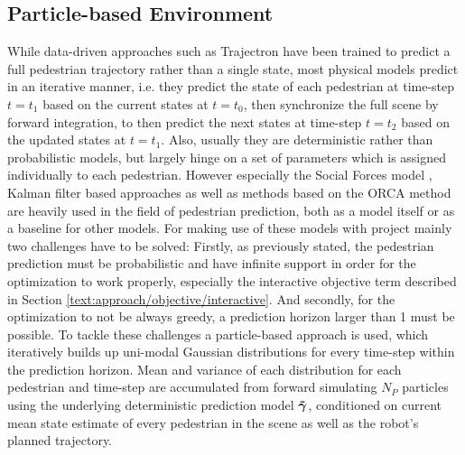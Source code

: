 \subsection{Particle-based Environment} 
While data-driven approaches such as Trajectron \cite{Ivanovic2018} have been trained to predict a full pedestrian trajectory rather than a single state, most physical models predict in an iterative manner, i.e. they predict the state of each pedestrian at time-step $t = t_1$ based on the current states at $t = t_0$, then synchronize the full scene by forward integration, to then predict the next states at time-step $t = t_2$ based on the updated states at $t = t_1$. Also, usually they are deterministic rather than probabilistic models, but largely hinge on a set of parameters which is assigned individually to each pedestrian. However especially the Social Forces model \cite{Helbing1995}, Kalman filter based approaches \cite{Schneider2013}\cite{Rehder2015}\cite{Guo2016} as well as methods based on the \ac{ORCA} method \cite{vandenBerg2011}\cite{Luo2018a}\cite{Charlton2019} are heavily used in the field of pedestrian prediction, both as a model itself or as a baseline for other models. For making use of these models with project \project mainly two challenges have to be solved: Firstly, as previously stated, the pedestrian prediction must be probabilistic and have infinite support in order for the optimization to work properly, especially the interactive objective term described in Section \ref{text:approach/objective/interactive}. And secondly, for the optimization to not be always greedy, a prediction horizon larger than 1 must be possible. 
\newline
To tackle these challenges a particle-based approach is used, which iteratively builds up uni-modal Gaussian distributions for every time-step within the prediction horizon. Mean and variance of each distribution for each pedestrian and time-step are accumulated from forward simulating $N_P$ particles using the underlying deterministic prediction model $\distmodeldet[]$, conditioned on current mean state estimate of every pedestrian in the scene as well as the robot's planned trajectory. 

